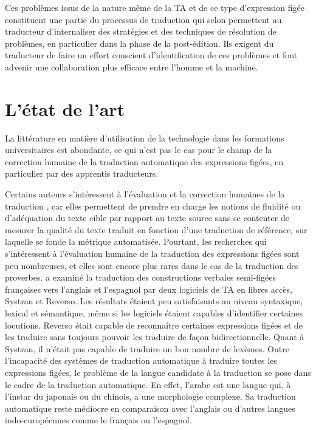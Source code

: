 \documentclass[french]{textolivre}
\begin{document}
Ces problèmes issus de la nature même de la TA et de ce type d’expression figée constituent une partie du processus de traduction qui selon \textcite[p.~9]{kussmaul_training_1995} permettent au traducteur d’internaliser des stratégies et des techniques de résolution de problèmes, en particulier dans la phase de la post-édition. Ils exigent du traducteur de faire un effort conscient d’identification de ces problèmes et font advenir une collaboration plus efficace entre l’homme et la machine.

\section{L’état de l’art}\label{sec-conduta}
La littérature en matière d’utilisation de la technologie dans les formations universitaires est abondante, ce qui n’est pas le cas pour le champ de la correction humaine de la traduction automatique des expressions figées, en particulier par des apprentis traducteurs.

Certains auteurs s’intéressent à l’évaluation et la correction humaines de la traduction \cite{blanchon_pour_2007}, car elles permettent de prendre en charge les notions de fluidité ou d’adéquation du texte cible par rapport au texte source sans se contenter de mesurer la qualité du texte traduit en fonction d’une traduction de référence, sur laquelle se fonde la métrique automatisée. Pourtant, les recherches qui s’intéressent à l’évaluation humaine de la traduction des expressions figées sont peu nombreuses, et elles sont encore plus rares dans le cas de la traduction des proverbes. \textcite{vaguer_expressions_2011} a examiné la traduction des constructions verbales semi-figées françaises vers l’anglais et l’espagnol par deux logiciels de TA en libres accès, Systran et Reverso. Les résultats étaient peu satisfaisants au niveau syntaxique, lexical et sémantique, même si les logiciels étaient capables d’identifier certaines locutions. Reverso était capable de reconnaître certaines expressions figées et de les traduire sans toujours pouvoir les traduire de façon bidirectionnelle. Quant à Systran, il n’était pas capable de traduire un bon nombre de lexèmes. Outre l’incapacité des systèmes de traduction automatique à traduire toutes les expressions figées, le problème de la langue candidate à la traduction se pose dans le cadre de la traduction automatique. En effet, l’arabe est une langue qui, à l’instar du japonais ou du chinois, a une morphologie complexe. Sa traduction automatique reste médiocre en comparaison avec l’anglais ou d’autres langues indo-européennes comme le français ou l’espagnol. 
\end{document}
